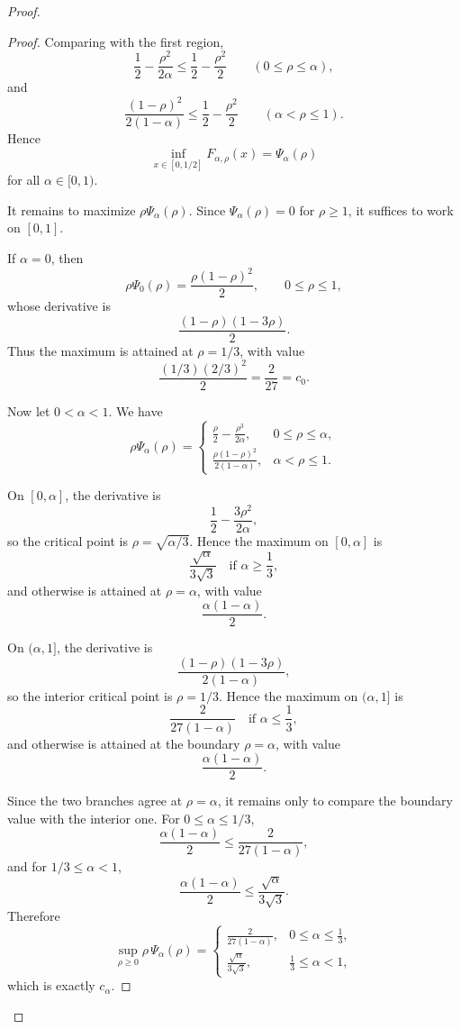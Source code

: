 \documentclass[conference]{IEEEtran}
\begin{document}
\begin{proof}[Proof]
\begin{proof}
Comparing with the first region,
\[
\frac12-\frac{\rho^2}{2\alpha}\le \frac12-\frac{\rho^2}{2}
\qquad (0\le \rho\le \alpha),
\]
and
\[
\frac{(1-\rho)^2}{2(1-\alpha)}\le \frac12-\frac{\rho^2}{2}
\qquad (\alpha<\rho\le 1).
\]
Hence
\[
\inf_{x\in[0,1/2]}F_{\alpha,\rho}(x)=\Psi_\alpha(\rho)
\]
for all \(\alpha\in[0,1)\).

It remains to maximize \(\rho\Psi_\alpha(\rho)\). Since \(\Psi_\alpha(\rho)=0\) for \(\rho\ge 1\), it suffices to work on \([0,1]\).

If \(\alpha=0\), then
\[
\rho\Psi_0(\rho)=\frac{\rho(1-\rho)^2}{2},\qquad 0\le \rho\le 1,
\]
whose derivative is
\[
\frac{(1-\rho)(1-3\rho)}{2}.
\]
Thus the maximum is attained at \(\rho=1/3\), with value
\[
\frac{(1/3)(2/3)^2}{2}=\frac{2}{27}=c_0.
\]

Now let \(0<\alpha<1\). We have
\[
\rho\Psi_\alpha(\rho)=
\begin{cases}
\displaystyle
\frac{\rho}{2}-\frac{\rho^3}{2\alpha}, & 0\le \rho\le \alpha,\\[2ex]
\displaystyle
\frac{\rho(1-\rho)^2}{2(1-\alpha)}, & \alpha<\rho\le 1.
\end{cases}
\]

On \([0,\alpha]\), the derivative is
\[
\frac12-\frac{3\rho^2}{2\alpha},
\]
so the critical point is \(\rho=\sqrt{\alpha/3}\). Hence the maximum on \([0,\alpha]\) is
\[
\frac{\sqrt{\alpha}}{3\sqrt3}
\quad\text{if }\alpha\ge \frac13,
\]
and otherwise is attained at \(\rho=\alpha\), with value
\[
\frac{\alpha(1-\alpha)}{2}.
\]

On \((\alpha,1]\), the derivative is
\[
\frac{(1-\rho)(1-3\rho)}{2(1-\alpha)},
\]
so the interior critical point is \(\rho=1/3\). Hence the maximum on \((\alpha,1]\) is
\[
\frac{2}{27(1-\alpha)}
\quad\text{if }\alpha\le \frac13,
\]
and otherwise is attained at the boundary \(\rho=\alpha\), with value
\[
\frac{\alpha(1-\alpha)}{2}.
\]

Since the two branches agree at \(\rho=\alpha\), it remains only to compare the boundary value with the interior one. For \(0\le \alpha\le 1/3\),
\[
\frac{\alpha(1-\alpha)}{2}\le \frac{2}{27(1-\alpha)},
\]
and for \(1/3\le \alpha<1\),
\[
\frac{\alpha(1-\alpha)}{2}\le \frac{\sqrt{\alpha}}{3\sqrt3}.
\]
Therefore
\[
\sup_{\rho\ge 0}\rho\,\Psi_\alpha(\rho)=
\begin{cases}
\displaystyle
\frac{2}{27(1-\alpha)}, & 0\le \alpha\le \frac13,\\[2ex]
\displaystyle
\frac{\sqrt{\alpha}}{3\sqrt3}, & \frac13\le \alpha<1,
\end{cases}
\]
which is exactly \(c_\alpha\).
\end{proof}


\end{proof}
\end{document}
